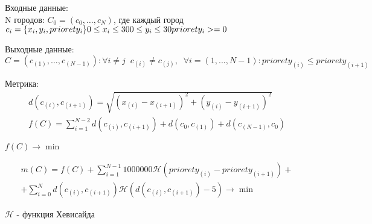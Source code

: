 \documentclass[12pt,a4paper]{article}
\begin{document}
Входные данные:\\
N городов: $C_0 = (c_0, \ldots, c_N)$, где каждый город $c_i = \{x_i, y_i, priorety_i\} \\ 
0 \leq x_i \leq 30 \\ 
0 \leq y_i \leq 30 \\ 
priorety_i >= 0$ 

Выходные данные:\\
$C = (c_{(1)}, \ldots, c_{(N-1)}) :  \forall i \neq j \;\; c_{(i)} \neq c_{(j)}, \;\; \forall i = (1,...,N-1) :  priorety_{(i)} \leq priorety_{(i+1)} $

Метрика:\\




\begin{align}
   d(c_{(i)}, c_{(i+1)}) = \sqrt{(x_{(i)}-x_{(i+1)})^2 + (y_{(i)}-y_{(i+1)})^2} \\
   f(C) = \sum_{i = 1}^{N-2}d(c_{(i)}, c_{(i+1)}) + d(c_{0}, c_{(1)}) + d(c_{(N-1)}, c_{0})
\end{align}

\begin{center}
 $f(C)\rightarrow \min$
\end{center}

\begin{align}
   m(C) = f(C) + \sum_{i = 1}^{N-1}1000000\mathcal{H}(priorety_{(i)} - priorety_{(i+1)}) + \\ +\sum_{i = 0}^{N}d(c_{(i)}, c_{(i+1)})\mathcal{H}(d(c_{(i)}, c_{(i+1)})-5) \rightarrow \min 
\end{align}


$\mathcal{H}$ - функция Хевисайда
\end{document}
